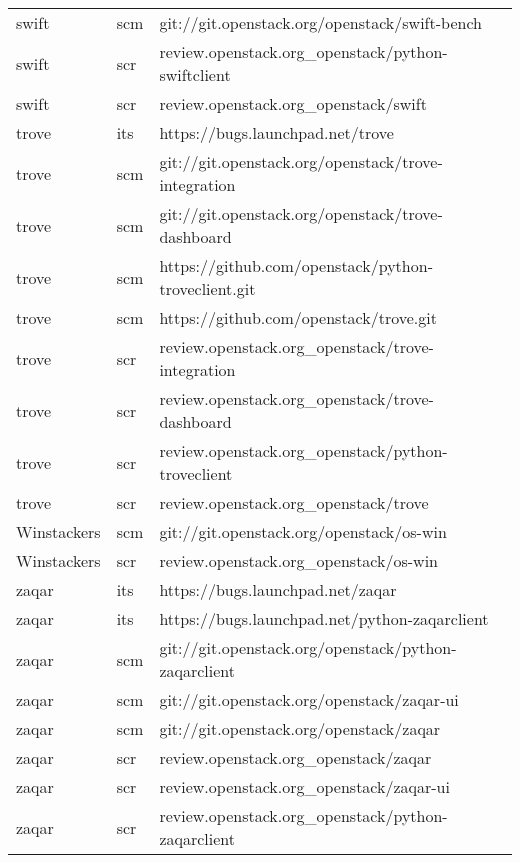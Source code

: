 \begin{center}
\begin{longtable}{|p{4cm}|p{1cm}|p{10cm}|}
swift&scm&git://git.openstack.org/openstack/swift-bench\\ 
swift&scr&review.openstack.org\_openstack/python-swiftclient\\ 
swift&scr&review.openstack.org\_openstack/swift\\ 
trove&its&https://bugs.launchpad.net/trove\\ 
trove&scm&git://git.openstack.org/openstack/trove-integration\\ 
trove&scm&git://git.openstack.org/openstack/trove-dashboard\\ 
trove&scm&https://github.com/openstack/python-troveclient.git\\ 
trove&scm&https://github.com/openstack/trove.git\\ 
trove&scr&review.openstack.org\_openstack/trove-integration\\ 
trove&scr&review.openstack.org\_openstack/trove-dashboard\\ 
trove&scr&review.openstack.org\_openstack/python-troveclient\\ 
trove&scr&review.openstack.org\_openstack/trove\\ 
Winstackers&scm&git://git.openstack.org/openstack/os-win\\ 
Winstackers&scr&review.openstack.org\_openstack/os-win\\ 
zaqar&its&https://bugs.launchpad.net/zaqar\\ 
zaqar&its&https://bugs.launchpad.net/python-zaqarclient\\ 
zaqar&scm&git://git.openstack.org/openstack/python-zaqarclient\\ 
zaqar&scm&git://git.openstack.org/openstack/zaqar-ui\\ 
zaqar&scm&git://git.openstack.org/openstack/zaqar\\ 
zaqar&scr&review.openstack.org\_openstack/zaqar\\ 
zaqar&scr&review.openstack.org\_openstack/zaqar-ui\\ 
zaqar&scr&review.openstack.org\_openstack/python-zaqarclient\\ 

\hline
\end{longtable}
\end{center}

